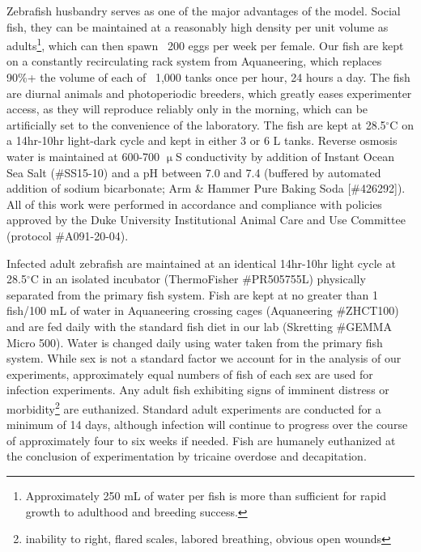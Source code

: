 Zebrafish husbandry serves as one of the major advantages of the model. Social fish, they can be maintained at a reasonably high density per unit volume as adults\footnote{Approximately 250 mL of water per fish is more than sufficient for rapid growth to adulthood and breeding success.}, which can then spawn ~200 eggs per week per female. Our fish are kept on a constantly recirculating rack system from Aquaneering, which replaces 90\%+ the volume of each of ~1,000 tanks once per hour, 24 hours a day. The fish are diurnal animals and photoperiodic breeders, which greatly eases experimenter access, as they will reproduce reliably only in the morning, which can be artificially set to the convenience of the laboratory. The fish are kept at 28.5$^{\circ}$C on a 14hr-10hr light-dark cycle and kept in either 3 or 6 L tanks. Reverse osmosis water is maintained at 600-700 $\upmu$S conductivity by addition of Instant Ocean Sea Salt (\#SS15-10) and a pH between 7.0 and 7.4 (buffered by automated addition of sodium bicarbonate; Arm \& Hammer Pure Baking Soda [\#426292]). All of this work were performed in accordance and compliance with policies approved by the Duke University Institutional Animal Care and Use Committee (protocol \#A091-20-04).

Infected adult zebrafish are maintained at an identical 14hr-10hr light cycle at 28.5$^{\circ}$C in an isolated incubator (ThermoFisher \#PR505755L) physically separated from the primary fish system. Fish are kept at no greater than 1 fish/100 mL of water in Aquaneering crossing cages (Aquaneering \#ZHCT100) and are fed daily with the standard fish diet in our lab (Skretting \#GEMMA Micro 500). Water is changed daily using water taken from the primary fish system. While sex is not a standard factor we account for in the analysis of our experiments, approximately equal numbers of fish of each sex are used for infection experiments. Any adult fish exhibiting signs of imminent distress or morbidity\footnote{inability to right, flared scales, labored breathing, obvious open wounds} are euthanized. Standard adult experiments are conducted for a minimum of 14 days, although infection will continue to progress over the course of approximately four to six weeks if needed. Fish are humanely euthanized at the conclusion of experimentation by tricaine overdose and decapitation.

